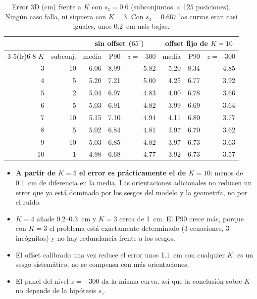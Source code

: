 \documentclass[11pt,a4paper]{article}
\begin{document}
\begin{table}[H]\centering\small
\begin{tabular}{rrrrrrrr}\toprule
 & & \multicolumn{3}{c}{sin offset ($65^\circ$)} & \multicolumn{3}{c}{offset fijo de $K=10$}\\\cmidrule(lr){3-5}\cmidrule(lr){6-8}
$K$ & subconj. & media & P90 & $z=-300$ & media & P90 & $z=-300$\\\midrule
3 & 10 & 6.06 & 8.99 & 5.82 & 5.20 & 8.34 & 4.85\\
4 & 5 & 5.20 & 7.21 & 5.00 & 4.25 & 6.77 & 3.92\\
5 & 2 & 5.04 & 6.97 & 4.83 & 4.00 & 6.78 & 3.66\\
6 & 5 & 5.03 & 6.91 & 4.82 & 3.99 & 6.69 & 3.64\\
7 & 10 & 5.15 & 7.10 & 4.94 & 4.11 & 6.80 & 3.77\\
8 & 5 & 5.02 & 6.84 & 4.81 & 3.97 & 6.70 & 3.62\\
9 & 10 & 5.03 & 6.85 & 4.82 & 3.97 & 6.73 & 3.63\\
10 & 1 & 4.98 & 6.68 & 4.77 & 3.92 & 6.73 & 3.57\\\bottomrule
\end{tabular}
\caption{Error 3D (cm) frente a $K$ con $s_z=0.6$ (subconjuntos $\times$ 125 posiciones). Ningún caso falla, ni siquiera con $K=3$. Con $s_z=0.667$ las curvas eran casi iguales, unos 0.2~cm más bajas.}
\end{table}
\begin{itemize}
\item \textbf{A partir de $K=5$ el error es prácticamente el de $K=10$}: menos de 0.1~cm de diferencia en la media. Las orientaciones adicionales no reducen un error que ya está dominado por los sesgos del modelo y la geometría, no por el ruido.
\item $K=4$ añade 0.2--0.3~cm y $K=3$ cerca de 1~cm. El P90 crece más, porque con $K=3$ el problema está exactamente determinado (3 ecuaciones, 3 incógnitas) y no hay redundancia frente a los sesgos.
\item El offset calibrado una vez reduce el error unos 1.1~cm con cualquier $K$: es un sesgo sistemático, no se compensa con más orientaciones.
\item El panel del nivel $z=-300$ da la misma curva, así que la conclusión sobre $K$ no depende de la hipótesis $s_z$.
\end{itemize}
\end{document}
